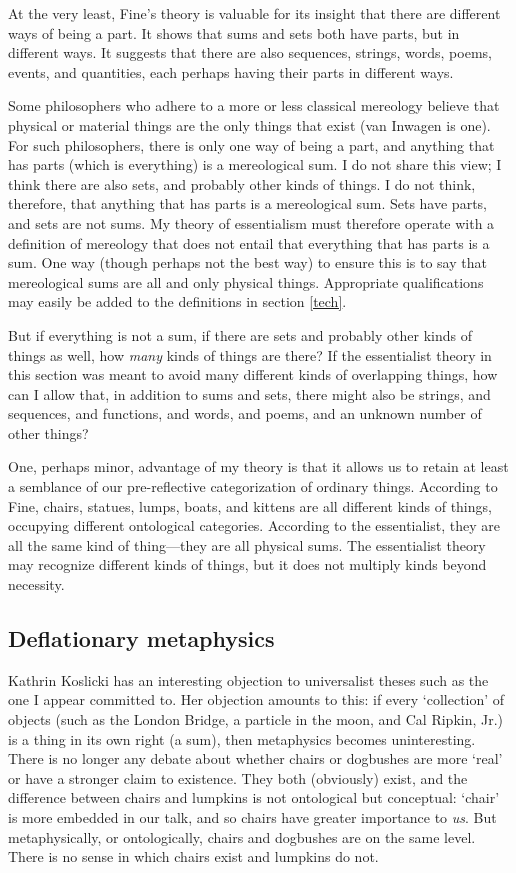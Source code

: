 \documentclass[11pt]{article}
\begin{document}
\begin{spacing}{1.5}
At the very least, Fine's theory is valuable for its insight that
there are different ways of being a part.  It shows that sums and sets
both have parts, but in different ways.  It suggests that there are
also sequences, strings, words, poems, events, and quantities, each
perhaps having their parts in different ways.

Some philosophers who adhere to a more or less classical mereology
believe that physical or material things are the only things that
exist (van Inwagen is one).  For such philosophers, there is only one
way of being a part, and anything that has parts (which is everything)
is a mereological sum.  I do not share this view; I think there are
also sets, and probably other kinds of things.  I do not think,
therefore, that anything that has parts is a mereological sum.  Sets
have parts, and sets are not sums.  My theory of essentialism must
therefore operate with a definition of mereology that does not entail
that everything that has parts is a sum.  One way (though perhaps not
the best way) to ensure this is to say that mereological sums are all
and only physical things.  Appropriate qualifications may easily be
added to the definitions in section \ref{tech}.

But if everything is not a sum, if there are sets and probably other
kinds of things as well, how {\em many} kinds of things are there?  If
the essentialist theory in this section was meant to avoid many
different kinds of overlapping things, how can I allow that, in
addition to sums and sets, there might also be strings, and sequences,
and functions, and words, and poems, and an unknown number of other
things?

One, perhaps minor, advantage of my theory is that it allows us to
retain at least a semblance of our pre-reflective categorization of
ordinary things.  According to Fine, chairs, statues, lumps, boats,
and kittens are all different kinds of things, occupying different
ontological categories.  According to the essentialist, they are all
the same kind of thing---they are all physical sums.  The essentialist
theory may recognize different kinds of things, but it does not
multiply kinds beyond necessity.

\subsection{Deflationary metaphysics}
\label{deflate}
Kathrin Koslicki has an interesting objection to universalist theses
such as the one I appear committed to.  Her objection amounts to this:
if every `collection' of objects (such as the London Bridge, a
particle in the moon, and Cal Ripkin, Jr.) is a thing in its own right
(a sum), then metaphysics becomes uninteresting.  There is no longer
any debate about whether chairs or dogbushes are more `real' or have a
stronger claim to existence.  They both (obviously) exist, and the
difference between chairs and lumpkins is not ontological but
conceptual: `chair' is more embedded in our talk, and so chairs have
greater importance to {\em us}.  But metaphysically, or ontologically,
chairs and dogbushes are on the same level.  There is no sense in
which chairs exist and lumpkins do not.


\end{spacing}
\end{document}
